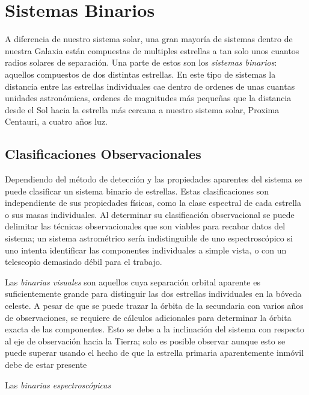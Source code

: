 \section{Sistemas Binarios}

A diferencia de nuestro sistema solar, una gran mayoría de sistemas dentro de
nuestra Galaxia están compuestas de multiples estrellas a tan solo unos cuantos
radios solares de separación. Una parte de estos son los \textit{sistemas
binarios}: aquellos compuestos de dos distintas estrellas. En este tipo de
sistemas la distancia entre las estrellas individuales cae dentro de ordenes de
unas cuantas unidades astronómicas, ordenes de magnitudes más pequeñas que la
distancia desde el Sol hacia la estrella más cercana a nuestro sistema solar,
Proxima Centauri, a cuatro años luz. 

\subsection{Clasificaciones Observacionales}

Dependiendo del método de detección y las propiedades aparentes del sistema se puede clasificar un sistema binario de estrellas. Estas clasificaciones son independiente de sus propiedades físicas, como la clase espectral de cada estrella o sus masas individuales. Al determinar su clasificación observacional se puede delimitar las técnicas observacionales que son viables para recabar datos del sistema; un sistema astrométrico sería indistinguible de uno espectroscópico si uno intenta identificar las componentes individuales a simple vista, o con un telescopio demasiado débil para el trabajo.

Las \textit{binarias visuales} son aquellos cuya separación orbital aparente es suficientemente grande para distinguir las dos estrellas individuales en la bóveda celeste. A pesar de que se puede trazar la órbita de la secundaria con varios años de observaciones, se requiere de cálculos adicionales para determinar la órbita exacta de las componentes. Esto se debe a la inclinación del sistema con respecto al eje de observación hacia la Tierra; solo es posible observar  \citet{fundamentalAstronomy::chapter10_binaryStars} aunque esto se puede superar usando el hecho de que la estrella primaria aparentemente inmóvil debe de estar presente 

Las \textit{binarias espectroscópicas}


